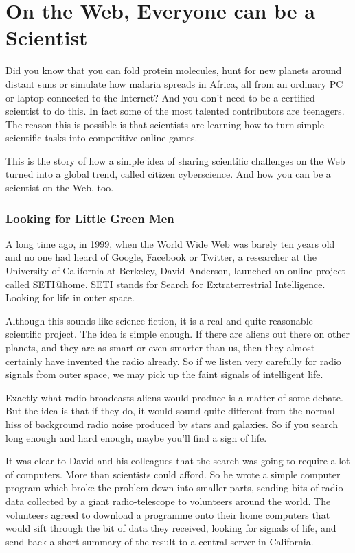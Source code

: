 \section{On the Web, Everyone can be a Scientist}
Did you know that you can fold protein molecules, hunt for new planets around distant suns or simulate how malaria spreads in Africa, all from an ordinary PC or laptop connected to the Internet? And you don’t need to be a certified scientist to do this. In fact some of the most talented contributors are teenagers. The reason this is possible is that scientists are learning how to turn simple scientific tasks into competitive online games. \par

This is the story of how a simple idea of sharing scientific challenges on the Web turned into a global trend, called citizen cyberscience. And how you can be a scientist on the Web, too.\par

\subsubsection{Looking for Little Green Men}
A long time ago, in 1999, when the World Wide Web was barely ten years old and no one had heard of Google, Facebook or Twitter, a researcher at the University of California at Berkeley, David Anderson, launched an online project called SETI@home. SETI stands for Search for Extraterrestrial Intelligence. Looking for life in outer space.\par

Although this sounds like science fiction, it is a real and quite reasonable scientific project. The idea is simple enough. If there are aliens out there on other planets, and they are as smart or even smarter than us, then they almost certainly have invented the radio already. So if we listen very carefully for radio signals from outer space, we may pick up the faint signals of intelligent life.\par

Exactly what radio broadcasts aliens would produce is a matter of some debate. But the idea is that if they do, it would sound quite different from the normal hiss of background radio noise produced by stars and galaxies. So if you search long enough and hard enough, maybe you’ll find a sign of life. 

It was clear to David and his colleagues that the search was going to require a lot of computers. More than scientists could afford. So he wrote a simple computer program which broke the problem down into smaller parts, sending bits of radio data collected by a giant radio-telescope to volunteers around the world. The volunteers agreed to download a programme onto their home computers that would sift through the bit of data they received, looking for signals of life, and send back a short summary of the result to a central server in California. 


